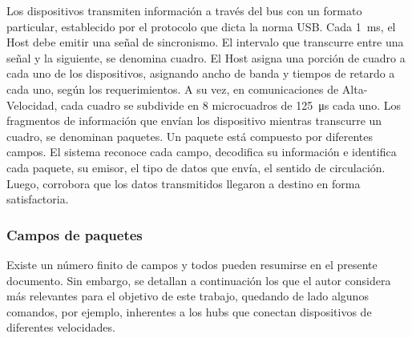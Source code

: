 Los dispositivos transmiten información a través del bus con un formato particular, establecido por el protocolo que dicta la norma USB. Cada \SI{1}{\milli\second}, el Host debe emitir una señal de sincronismo. El intervalo que transcurre entre una señal y la siguiente, se denomina cuadro. El Host asigna una porción de cuadro a cada uno de los dispositivos, asignando ancho de banda y tiempos de retardo a cada uno, según los requerimientos. A su vez, en comunicaciones de Alta-Velocidad, cada cuadro se subdivide en 8 microcuadros de \SI{125}{\micro\second} cada uno. Los fragmentos de información que envían los dispositivo mientras transcurre un cuadro, se denominan paquetes. Un paquete está compuesto por diferentes campos. El sistema reconoce cada campo, decodifica su información e identifica cada paquete, su emisor, el tipo de datos que envía, el sentido de circulación. Luego, corrobora que los datos transmitidos llegaron a destino en forma satisfactoria. 

\subsubsection{Campos de paquetes}
	Existe un número finito de campos y todos pueden resumirse en el presente documento. Sin embargo, se detallan a continuación los que el autor considera más relevantes para el objetivo de este trabajo, quedando de lado algunos comandos, por ejemplo, inherentes a los hubs que conectan dispositivos de diferentes velocidades.


